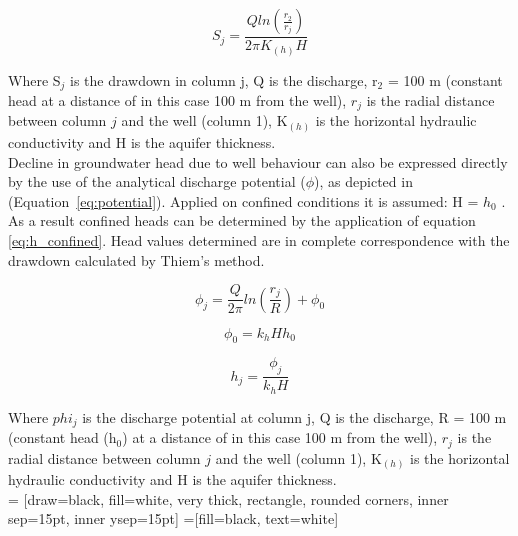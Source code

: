 \begin{equation}
 S_j = \frac{Q ln(\frac{r_{2}}{r_{j}})}{2\pi K_{(h)}H}
 \label{eq:thiem}
 \end{equation} 

Where S$_j$ is the drawdown in column j, Q is the discharge, r$_2$ = 100 m (constant head at a distance of in this case 100 m from the well), $r_j$ is the radial distance between column $j$ and the well (column 1), K$_{(h)}$ is the horizontal hydraulic conductivity and H is the aquifer thickness.\\

Decline in groundwater head due to well behaviour can also be expressed directly by the use of the analytical discharge potential ($\phi$), as depicted in (Equation~\ref{eq:potential}). Applied on confined conditions it is assumed: H = $h_0$ \citep{Bakker2011,Strack1989}. As a result confined heads can be determined by the application of equation \ref{eq:h_confined}. Head values determined are in complete correspondence with the drawdown calculated by Thiem's method. 

\begin{equation}
 \phi_j = \frac{Q}{2\pi} ln(\frac{r_j}{R}) + \phi_0
 \label{eq:potential}
\end{equation}  

\begin{equation}
 \phi_0 = k_{h}Hh_0
 \label{eq:pot_confined}
\end{equation}  

\begin{equation}
 h_j = \frac{\phi_j}{k_{h}H} 
 \label{eq:h_confined}
\end{equation}  

Where $phi_j$ is the discharge potential at column j, Q is the discharge, R = 100 m (constant head (h$_0$) at a distance of in this case 100 m from the well), $r_j$ is the radial distance between column $j$ and the well (column 1), K$_{(h)}$ is the horizontal hydraulic conductivity and H is the aquifer thickness.\\

 = [draw=black, fill=white, very thick,
    rectangle, rounded corners, inner sep=15pt, inner ysep=15pt]
 =[fill=black, text=white]



